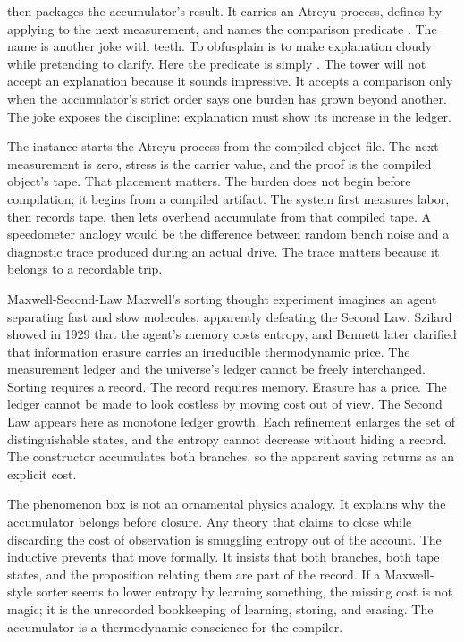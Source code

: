  then packages the accumulator's result. It carries an
Atreyu process, defines  by applying  to the next
measurement, and names the comparison predicate . The name
is another joke with teeth. To obfusplain is to make explanation cloudy while
pretending to clarify. Here the predicate is simply . The tower
will not accept an explanation because it sounds impressive. It accepts a
comparison only when the accumulator's strict order says one burden has grown
beyond another. The joke exposes the discipline: explanation must show its
increase in the ledger.

The instance  starts the Atreyu process from the compiled
object file. The next measurement is zero, stress is the carrier value, and
the proof is the compiled object's tape. That placement matters. The burden
does not begin before compilation; it begins from a compiled artifact. The
system first measures labor, then records tape, then lets overhead accumulate
from that compiled tape. A speedometer analogy would be the difference between
random bench noise and a diagnostic trace produced during an actual drive. The
trace matters because it belongs to a recordable trip.

\begin{gphenom}{Maxwell-Second-Law}
\label{ph:maxwell-second-law}
\GPhObs Maxwell's sorting thought experiment imagines an agent separating fast
and slow molecules, apparently defeating the Second Law. Szilard showed in
1929 that the agent's memory costs entropy, and Bennett later clarified that
information erasure carries an irreducible thermodynamic price.
\GPhCon The measurement ledger and the universe's ledger cannot be freely
interchanged. Sorting requires a record. The record requires memory. Erasure
has a price. The ledger cannot be made to look costless by moving cost out of
view.
\GPhSeq The Second Law appears here as monotone ledger growth. Each refinement
enlarges the set of distinguishable states, and the entropy cannot decrease
without hiding a record. The constructor  accumulates both
branches, so the apparent saving returns as an explicit cost.
\end{gphenom}

The phenomenon box is not an ornamental physics analogy. It explains why the
accumulator belongs before closure. Any theory that claims to close while
discarding the cost of observation is smuggling entropy out of the account.
The  inductive prevents that move formally. It insists that
both branches, both tape states, and the proposition relating them are part of
the record. If a Maxwell-style sorter seems to lower entropy by learning
something, the missing cost is not magic; it is the unrecorded bookkeeping of
learning, storing, and erasing. The accumulator is a thermodynamic conscience
for the compiler.

